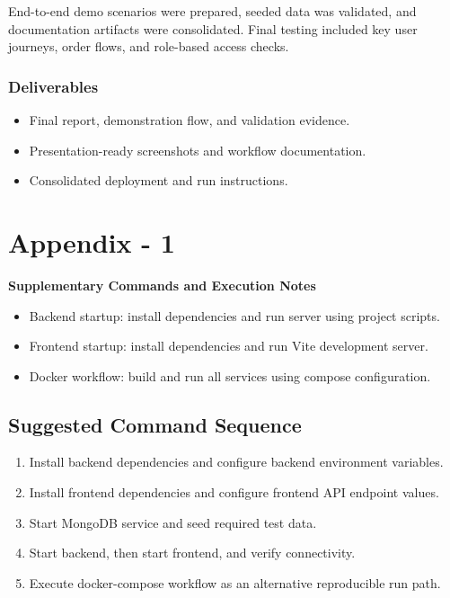 \documentclass[12pt,a4paper]{report}
\begin{document}
End-to-end demo scenarios were prepared, seeded data was validated, and documentation artifacts were consolidated. Final testing included key user journeys, order flows, and role-based access checks.

\subsection{Deliverables}
\begin{itemize}
    \item Final report, demonstration flow, and validation evidence.
    \item Presentation-ready screenshots and workflow documentation.
    \item Consolidated deployment and run instructions.
\end{itemize}

\appendix

\chapter{Appendix - 1}
\textbf{Supplementary Commands and Execution Notes}

\begin{itemize}
    \item Backend startup: install dependencies and run server using project scripts.
    \item Frontend startup: install dependencies and run Vite development server.
    \item Docker workflow: build and run all services using compose configuration.
\end{itemize}

\section{Suggested Command Sequence}
\begin{enumerate}
    \item Install backend dependencies and configure backend environment variables.
    \item Install frontend dependencies and configure frontend API endpoint values.
    \item Start MongoDB service and seed required test data.
    \item Start backend, then start frontend, and verify connectivity.
    \item Execute docker-compose workflow as an alternative reproducible run path.
\end{enumerate}
\end{document}
